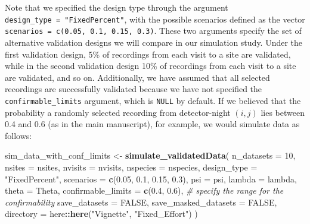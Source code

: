 \documentclass[
]{article}
\newenvironment{Shaded}{\begin{snugshade}}{\end{snugshade}}
\newcommand{\AttributeTok}[1]{\textcolor[rgb]{0.13,0.29,0.53}{#1}}
\newcommand{\CommentTok}[1]{\textcolor[rgb]{0.56,0.35,0.01}{\textit{#1}}}
\newcommand{\ConstantTok}[1]{\textcolor[rgb]{0.56,0.35,0.01}{#1}}
\newcommand{\DecValTok}[1]{\textcolor[rgb]{0.00,0.00,0.81}{#1}}
\newcommand{\FloatTok}[1]{\textcolor[rgb]{0.00,0.00,0.81}{#1}}
\newcommand{\FunctionTok}[1]{\textcolor[rgb]{0.13,0.29,0.53}{\textbf{#1}}}
\newcommand{\NormalTok}[1]{#1}
\newcommand{\OtherTok}[1]{\textcolor[rgb]{0.56,0.35,0.01}{#1}}
\newcommand{\SpecialCharTok}[1]{\textcolor[rgb]{0.81,0.36,0.00}{\textbf{#1}}}
\newcommand{\StringTok}[1]{\textcolor[rgb]{0.31,0.60,0.02}{#1}}
\begin{document}
\linespread{1}

Note that we specified the design type through the argument \texttt{design\_type\ =\ "FixedPercent"}, with the possible scenarios defined as the vector \texttt{scenarios\ =\ c(0.05,\ 0.1,\ 0.15,\ 0.3)}. These two arguments specify the set of alternative validation designs we will compare in our simulation study. Under the first validation design, 5\% of recordings from each visit to a site are validated, while in the second validation design 10\% of recordings from each visit to a site are validated, and so on.
Additionally, we have assumed that all selected recordings are successfully validated because we have not specified the \texttt{confirmable\_limits} argument, which is \texttt{NULL} by default. If we believed that the probability a randomly selected recording from detector-night \((i,j)\) lies between 0.4 and 0.6 (as in the main manuscript), for example, we would simulate data as follows:

\linespread{1}

\begin{Shaded}
\begin{Highlighting}[]
\NormalTok{sim\_data\_with\_conf\_limits }\OtherTok{\textless{}{-}} \FunctionTok{simulate\_validatedData}\NormalTok{(}
    \AttributeTok{n\_datasets =} \DecValTok{10}\NormalTok{,}
    \AttributeTok{nsites =}\NormalTok{ nsites, }
    \AttributeTok{nvisits =}\NormalTok{ nvisits, }
    \AttributeTok{nspecies =}\NormalTok{ nspecies, }
    \AttributeTok{design\_type =} \StringTok{"FixedPercent"}\NormalTok{, }
    \AttributeTok{scenarios =} \FunctionTok{c}\NormalTok{(}\FloatTok{0.05}\NormalTok{, }\FloatTok{0.1}\NormalTok{, }\FloatTok{0.15}\NormalTok{, }\FloatTok{0.3}\NormalTok{),}
    \AttributeTok{psi =}\NormalTok{ psi, }
    \AttributeTok{lambda =}\NormalTok{ lambda,}
    \AttributeTok{theta =}\NormalTok{ Theta, }
    \AttributeTok{confirmable\_limits =} \FunctionTok{c}\NormalTok{(}\FloatTok{0.4}\NormalTok{, }\FloatTok{0.6}\NormalTok{), }\CommentTok{\# specify the range for the confirmability}
    \AttributeTok{save\_datasets =} \ConstantTok{FALSE}\NormalTok{, }
    \AttributeTok{save\_masked\_datasets =} \ConstantTok{FALSE}\NormalTok{, }
    \AttributeTok{directory =}\NormalTok{ here}\SpecialCharTok{::}\FunctionTok{here}\NormalTok{(}\StringTok{"Vignette"}\NormalTok{, }\StringTok{"Fixed\_Effort"}\NormalTok{)}
\NormalTok{)}
\end{Highlighting}
\end{Shaded}

\linespread{1}
\end{document}
